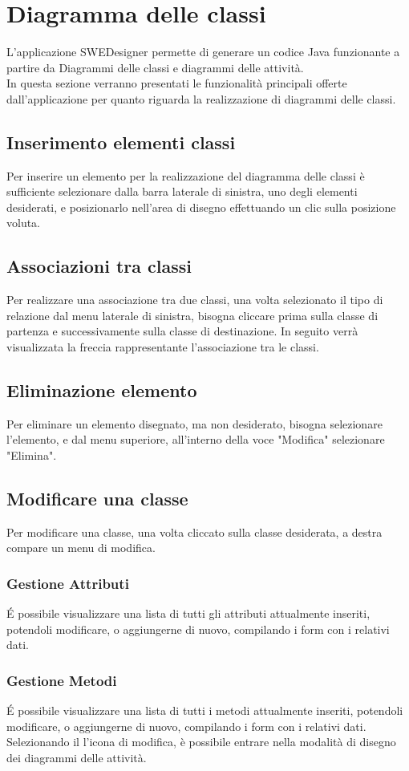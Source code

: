 \section{Diagramma delle classi}
L'applicazione SWEDesigner permette di generare un codice Java funzionante a partire da Diagrammi delle classi e diagrammi delle attività.\\
In questa sezione verranno presentati le funzionalità principali offerte dall'applicazione per quanto riguarda la realizzazione di diagrammi delle classi.

\subsection{Inserimento elementi classi}
Per inserire un elemento per la realizzazione del diagramma delle classi è sufficiente selezionare dalla barra laterale di sinistra, uno degli elementi desiderati, e posizionarlo nell'area di disegno effettuando un clic sulla posizione voluta.

\subsection{Associazioni tra classi}
Per realizzare una associazione tra due classi, una volta selezionato il tipo di relazione dal menu laterale di sinistra, bisogna cliccare prima sulla classe di partenza e successivamente sulla classe di destinazione. In seguito verrà visualizzata la freccia rappresentante l'associazione tra le classi.

\subsection{Eliminazione elemento}
Per eliminare un elemento disegnato, ma non desiderato, bisogna selezionare l'elemento, e dal menu superiore, all'interno della voce "Modifica" selezionare "Elimina".

\subsection{Modificare una classe}
Per modificare una classe, una volta cliccato sulla classe desiderata, a destra compare un menu di modifica.

\subsubsection{Gestione Attributi}
É possibile visualizzare una lista di tutti gli attributi attualmente inseriti, potendoli modificare, o aggiungerne di nuovo, compilando i form con i relativi dati.

\subsubsection{Gestione Metodi}
É possibile visualizzare una lista di tutti i metodi attualmente inseriti, potendoli modificare, o aggiungerne di nuovo, compilando i form con i relativi dati. Selezionando il l'icona di modifica, è possibile entrare nella modalità di disegno dei diagrammi delle attività.